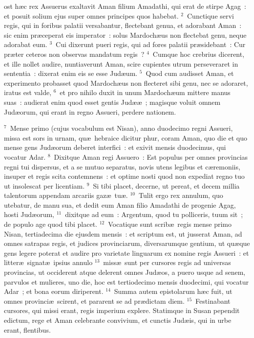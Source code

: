 \bchapter
{}ost h\ae c rex Assuerus exaltavit Aman filium Amadathi, qui erat de stirpe Agag~: et posuit solium ejus super omnes principes quos habebat.
${}^{2}$~Cunctique servi regis, qui in foribus palatii versabantur, flectebant genua, et adorabant Aman~: sic enim pr\ae ceperat eis imperator~: solus Mardoch\ae us non flectebat genu, neque adorabat eum.
${}^{3}$~Cui dixerunt pueri regis, qui ad fores palatii pr\ae sidebant~: Cur pr\ae ter ceteros non observas mandatum regis~?
${}^{4}$~Cumque hoc crebrius dicerent, et ille nollet audire, nuntiaverunt Aman, scire cupientes utrum perseveraret in sententia~: dixerat enim eis se esse Jud\ae um.
${}^{5}$~Quod cum audisset Aman, et experimento probasset quod Mardoch\ae us non flecteret sibi genu, nec se adoraret, iratus est valde,
${}^{6}$~et pro nihilo duxit in unum Mardoch\ae um mittere manus suas~: audierat enim quod esset gentis Jud\ae \ae~; magisque voluit omnem Jud\ae orum, qui erant in regno Assueri, perdere nationem.


${}^{7}$~Mense primo (cujus vocabulum est Nisan), anno duodecimo regni Assueri, missa est sors in urnam, qu\ae\ hebraice dicitur phur, coram Aman, quo die et quo mense gens Jud\ae orum deberet interfici~: et exivit mensis duodecimus, qui vocatur Adar.
${}^{8}$~Dixitque Aman regi Assuero~: Est populus per omnes provincias regni tui dispersus, et a se mutuo separatus, novis utens legibus et c\ae remoniis, insuper et regis scita contemnens~: et optime nosti quod non expediat regno tuo ut insolescat per licentiam.
${}^{9}$~Si tibi placet, decerne, ut pereat, et decem millia talentorum appendam arcariis gaz\ae\ tu\ae .
${}^{10}$~Tulit ergo rex annulum, quo utebatur, de manu sua, et dedit eum Aman filio Amadathi de progenie Agag, hosti Jud\ae orum,
${}^{11}$~dixitque ad eum~: Argentum, quod tu polliceris, tuum sit~; de populo age quod tibi placet.
${}^{12}$~Vocatique sunt scrib\ae\ regis mense primo Nisan, tertiadecima die ejusdem mensis~: et scriptum est, ut jusserat Aman, ad omnes satrapas regis, et judices provinciarum, diversarumque gentium, ut qu\ae que gens legere poterat et audire pro varietate linguarum ex nomine regis Assueri~: et litter\ae\ signat\ae\ ipsius annulo
${}^{13}$~miss\ae\ sunt per cursores regis ad universas provincias, ut occiderent atque delerent omnes Jud\ae os, a puero usque ad senem, parvulos et mulieres, uno die, hoc est tertiodecimo mensis duodecimi, qui vocatur Adar~; et bona eorum diriperent.
${}^{14}$~Summa autem epistolarum h\ae c fuit, ut omnes provinci\ae\ scirent, et pararent se ad pr\ae dictam diem.
${}^{15}$~Festinabant cursores, qui missi erant, regis imperium explere. Statimque in Susan pependit edictum, rege et Aman celebrante convivium, et cunctis Jud\ae is, qui in urbe erant, flentibus.

